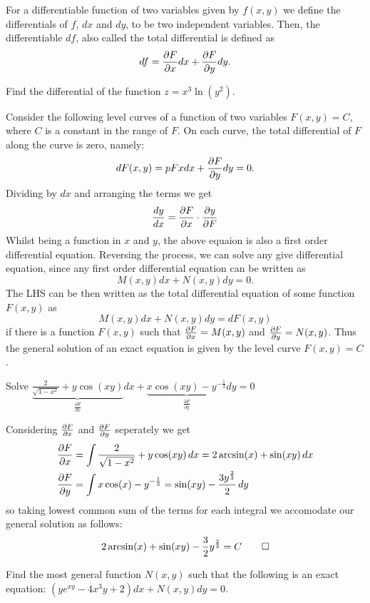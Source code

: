 

\begin{definition}
For a differentiable function of two variables given by $f(x,y)$ we define the
differentials of $f$, $dx$ and $dy$, to be two independent variables. Then, the
differentiable $df$, also called the total differential is defined as 
\[df =  \frac{\partial F}{\partial x} dx + \frac{\partial F}{\partial y}dy.\]
\end{definition}

\begin{example}
Find the differential of the function $z=x^3\ln(y^2)$.
\end{example}

Consider the following level curves of a function of two variables $F(x,y) = C$,
where $C$ is a constant in the range of $F$. On each curve, the total differential of
$F$ along the curve is zero, namely:
\[dF(x,y) =  p F x dx +  \frac{\partial F}{\partial y} dy  = 0.\]
Dividing by $dx$ and arranging the terms we get 
\[\frac{dy}{dx} = \frac{\partial F}{\partial x} \cdot \frac{\partial y}{\partial F}\]
Whilst being a function in $x$ and $y$, the above equaion is also a first order
differential equation. Reversing the process, we can solve any give differential
equation, since any first order differential equation can be written as 
\[M(x,y)dx + N(x,y)dy = 0.\]
The LHS can be then written as the total differential equation of some function $F(x,y)$
as \[M(x,y) dx + N(x,y) dy =  dF(x,y)\] if there is a function $F(x,y)$ such that
$\frac{\partial F}{\partial x}= M(x,y)$ and $\frac{\partial F}{\partial y} = N(x,y)$. Thus the
general solution of an exact equation is given by the level curve $F(x,y) = C$.

\begin{example}
	Solve $\underbrace{\frac{2}{\sqrt{1-x^2}} + y\cos(xy)}_{\frac{\partial F}{\partial x}}dx 
		  + \underbrace{x\cos(xy) - y^{-\frac{1}{3}}}_{\frac{\partial F}{\partial y}}dy = 0$
\end{example}
Considering $\frac{\partial F}{\partial x}$ and $\frac{\partial F}{\partial y}$ seperately we get
\begin{align*}
	\frac{\partial F}{\partial x}  &= \int \frac{2}{\sqrt{1-x^2}} + y\cos(xy)\,dx = 2\arcsin(x) + \sin(xy)\,dx\\
	\frac{\partial F}{\partial y} &= \int x\cos(x) - y^{-\frac{1}{3}} = \sin(xy) - \frac{3y^{\frac{2}{3}}}{2}\,dy
\end{align*}
so taking lowest common sum of the terms for each integral we accomodate our general solution as follows:
\[2\arcsin(x) + \sin(xy) - \frac{3}{2}y^{\frac{2}{3}} = C \qed\]
\begin{example}
	Find the most general function $N(x, y)$ such that the following is an exact equation:
	$(ye^{xy}-4x^3y+2)dx + N(x, y)dy = 0$.
\end{example}

